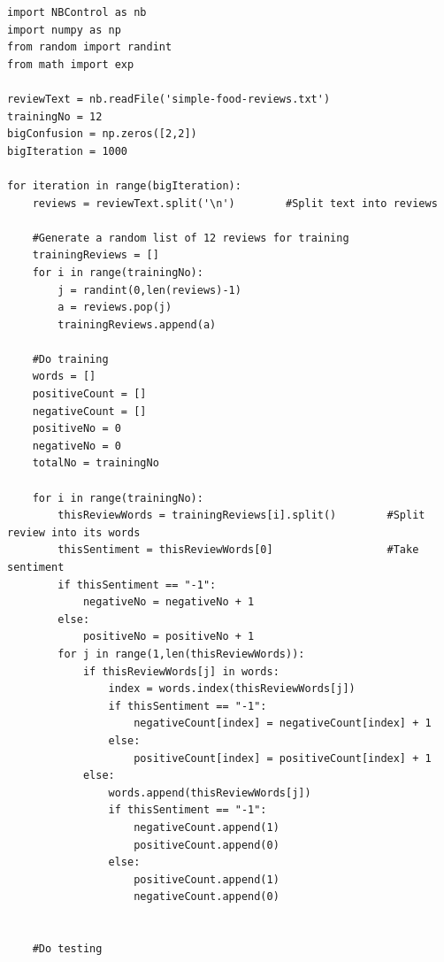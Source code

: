 \documentclass[10pt]{article}
\begin{document}
\begin{lstlisting}
import NBControl as nb
import numpy as np
from random import randint
from math import exp

reviewText = nb.readFile('simple-food-reviews.txt')
trainingNo = 12
bigConfusion = np.zeros([2,2])
bigIteration = 1000

for iteration in range(bigIteration):
    reviews = reviewText.split('\n')        #Split text into reviews

    #Generate a random list of 12 reviews for training
    trainingReviews = []
    for i in range(trainingNo):
        j = randint(0,len(reviews)-1)
        a = reviews.pop(j)
        trainingReviews.append(a)

    #Do training
    words = []
    positiveCount = []
    negativeCount = []
    positiveNo = 0
    negativeNo = 0
    totalNo = trainingNo

    for i in range(trainingNo):
        thisReviewWords = trainingReviews[i].split()        #Split review into its words
        thisSentiment = thisReviewWords[0]                  #Take sentiment
        if thisSentiment == "-1":
            negativeNo = negativeNo + 1
        else:
            positiveNo = positiveNo + 1
        for j in range(1,len(thisReviewWords)):
            if thisReviewWords[j] in words:
                index = words.index(thisReviewWords[j])
                if thisSentiment == "-1":
                    negativeCount[index] = negativeCount[index] + 1
                else:
                    positiveCount[index] = positiveCount[index] + 1
            else:
                words.append(thisReviewWords[j])
                if thisSentiment == "-1":
                    negativeCount.append(1)
                    positiveCount.append(0)
                else:
                    positiveCount.append(1)
                    negativeCount.append(0)


    #Do testing


\end{lstlisting}
\end{document}

